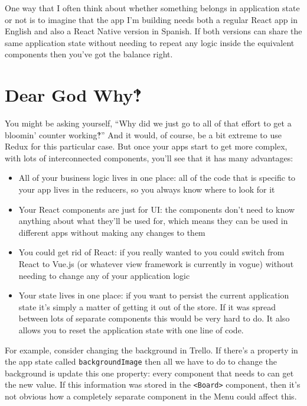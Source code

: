One way that I often think about whether something belongs in application state or not is to imagine that the app I'm building needs both a regular React app in English and also a React Native version in Spanish. If both versions can share the same application state without needing to repeat any logic inside the equivalent components then you've got the balance right.




\section{Dear God Why‽}

You might be asking yourself, ``Why did we just go to all of that effort to get a bloomin' counter working‽'' And it would, of course, be a bit extreme to use Redux for this particular case. But once your apps start to get more complex, with lots of interconnected components, you'll see that it has many advantages:

\begin{itemize}
    \item All of your business logic lives in one place: all of the code that is specific to your app lives in the reducers, so you always know where to look for it
    \item Your React components are just for UI: the components don't need to know anything about what they'll be used for, which means they can be used in different apps without making any changes to them
    \item You could get rid of React: if you really wanted to you could switch from React to Vue.js (or whatever view framework is currently in vogue) without needing to change any of your application logic
    \item Your state lives in one place: if you want to persist the current application state it's simply a matter of getting it out of the store. If it was spread between lots of separate components this would be very hard to do. It also allows you to reset the application state with one line of code.
\end{itemize}

For example, consider changing the background in Trello. If there's a property in the app state called \texttt{backgroundImage} then all we have to do to change the background is update this one property: every component that needs to can get the new value. If this information was stored in the \texttt{<Board>} component, then it's not obvious how a completely separate component in the Menu could affect this.
\\

